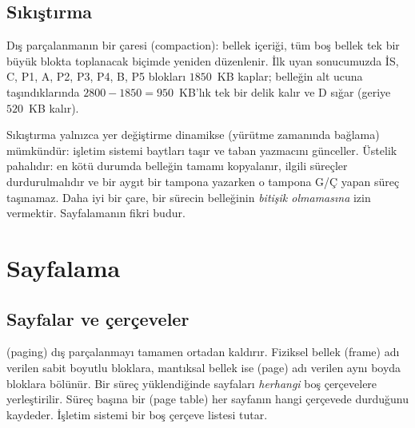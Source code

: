 \subsection{Sıkıştırma}

Dış parçalanmanın bir çaresi  (compaction): bellek içeriği, tüm boş bellek tek bir büyük blokta toplanacak biçimde yeniden düzenlenir. İlk uyan sonucumuzda İS, C, P1, A, P2, P3, P4, B, P5 blokları $1850$~KB kaplar; belleğin alt ucuna taşındıklarında $2800 - 1850 = 950$~KB'lık tek bir delik kalır ve D sığar (geriye $520$~KB kalır).

Sıkıştırma yalnızca yer değiştirme dinamikse (yürütme zamanında bağlama) mümkündür: işletim sistemi baytları taşır ve taban yazmacını günceller. Üstelik pahalıdır: en kötü durumda belleğin tamamı kopyalanır, ilgili süreçler durdurulmalıdır ve bir aygıt bir tampona yazarken o tampona G/Ç yapan süreç taşınamaz. Daha iyi bir çare, bir sürecin belleğinin \emph{bitişik olmamasına} izin vermektir. Sayfalamanın fikri budur.

\section{Sayfalama}
\label{sec:paging}

\subsection{Sayfalar ve çerçeveler}

 (paging) dış parçalanmayı tamamen ortadan kaldırır. Fiziksel bellek  (frame) adı verilen sabit boyutlu bloklara, mantıksal bellek ise  (page) adı verilen aynı boyda bloklara bölünür. Bir süreç yüklendiğinde sayfaları \emph{herhangi} boş çerçevelere yerleştirilir. Süreç başına bir  (page table) her sayfanın hangi çerçevede durduğunu kaydeder. İşletim sistemi bir boş çerçeve listesi tutar.


